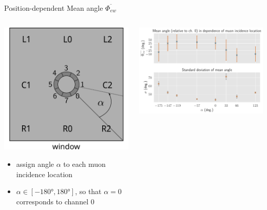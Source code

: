\documentclass[aspectratio=169]{beamer}
\begin{document}
	\begin{frame}{Position-dependent Mean angle $\overline{\Phi_{ew}}$}
		\begin{columns}
			
			\begin{column}{0.4\textwidth}
				\centering
				\includegraphics[width=.7\textwidth]{pictures/relative-locations.pdf}
				\begin{itemize}
					\item assign angle $\alpha$ to each muon incidence location
					\item $\alpha \in \left[-\ang{180},\ang{180}\right]$, so that $\alpha = 0$ corresponds to channel 0
				\end{itemize}
			\end{column}
		
			\begin{column}{0.6\textwidth}
				\includegraphics[width=\textwidth]{pictures/phi-ew-std-sep.pdf}
			\end{column}
		
		\end{columns}
	
	
	\end{frame}
\end{document}
